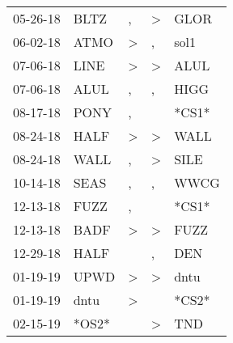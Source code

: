 \begin{supertabular}{p{0.07\textwidth}p{0.06\textwidth}p{0.02\textwidth}p{0.02\textwidth}p{0.06\textwidth}}
          05-26-18\textsuperscript{} &           BLTZ\textsuperscript{} &                , &     \textgreater &           GLOR\textsuperscript{} \\
          06-02-18\textsuperscript{} &           ATMO\textsuperscript{} &     \textgreater &                , &           sol1\textsuperscript{} \\
          07-06-18\textsuperscript{} &           LINE\textsuperscript{} &     \textgreater &     \textgreater &           ALUL\textsuperscript{} \\
          07-06-18\textsuperscript{} &           ALUL\textsuperscript{} &                , &                , &           HIGG\textsuperscript{} \\
          08-17-18\textsuperscript{} &           PONY\textsuperscript{} &                , &                  &                            *CS1* \\
          08-24-18\textsuperscript{} &           HALF\textsuperscript{} &     \textgreater &     \textgreater &           WALL\textsuperscript{} \\
          08-24-18\textsuperscript{} &           WALL\textsuperscript{} &                , &     \textgreater &           SILE\textsuperscript{} \\
          10-14-18\textsuperscript{} &           SEAS\textsuperscript{} &                , &                , &           WWCG\textsuperscript{} \\
          12-13-18\textsuperscript{} &           FUZZ\textsuperscript{} &                , &                  &                            *CS1* \\
          12-13-18\textsuperscript{} &           BADF\textsuperscript{} &     \textgreater &     \textgreater &           FUZZ\textsuperscript{} \\
          12-29-18\textsuperscript{} &           HALF\textsuperscript{} &                  &                , &            DEN\textsuperscript{} \\
          01-19-19\textsuperscript{} &           UPWD\textsuperscript{} &     \textgreater &     \textgreater &           dntu\textsuperscript{} \\
          01-19-19\textsuperscript{} &           dntu\textsuperscript{} &     \textgreater &                  &                            *CS2* \\
          02-15-19\textsuperscript{} &                            *OS2* &                  &     \textgreater &            TND\textsuperscript{} \\

\end{supertabular}
